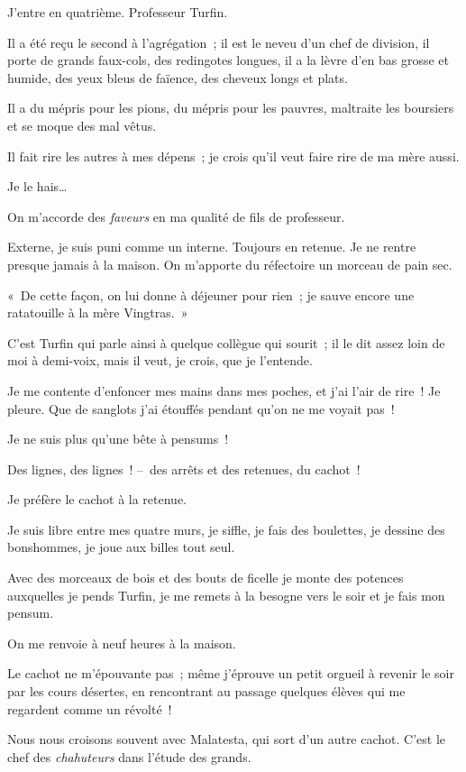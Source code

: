 \documentclass[french,twoside]{book} %
\begin{document}
\noindent J’entre en quatrième. Professeur Turfin.\par
Il a été reçu le second à l’agrégation ; il est le neveu d’un chef de division, il porte de grands faux-cols, des redingotes longues, il a la lèvre d’en bas grosse et humide, des yeux bleus de faïence, des cheveux longs et plats.\par
Il a du mépris pour les pions, du mépris pour les pauvres, maltraite les boursiers et se moque des mal vêtus.\par
Il fait rire les autres à mes dépens ; je crois qu’il veut faire rire de ma mère aussi.\par
Je le hais…\par
\bigbreak
\noindent On m’accorde des \emph{faveurs} en ma qualité de fils de professeur.\par
Externe, je suis puni comme un interne. Toujours en retenue. Je ne rentre presque jamais à la maison. On m’apporte du réfectoire un morceau de pain sec.\par
« De cette façon, on lui donne à déjeuner pour rien ; je sauve encore une ratatouille à la mère Vingtras. »\par
C’est Turfin qui parle ainsi à quelque collègue qui sourit ; il le dit assez loin de moi à demi-voix, mais il veut, je crois, que je l’entende.\par
Je me contente d’enfoncer mes mains dans mes poches, et j’ai l’air de rire ! Je pleure. Que de sanglots j’ai étouffés pendant qu’on ne me voyait pas !\par
\bigbreak
\noindent Je ne suis plus qu’une bête à pensums !\par
Des lignes, des lignes ! – des arrêts et des retenues, du cachot !\par
Je préfère le cachot à la retenue.\par
Je suis libre entre mes quatre murs, je siffle, je fais des boulettes, je dessine des bonshommes, je joue aux billes tout seul.\par
Avec des morceaux de bois et des bouts de ficelle je monte des potences auxquelles je pends Turfin, je me remets à la besogne vers le soir et je fais mon pensum.\par
On me renvoie à neuf heures à la maison.\par
Le cachot ne m’épouvante pas ; même j’éprouve un petit orgueil à revenir le soir par les cours désertes, en rencontrant au passage quelques élèves qui me regardent comme un révolté !\par
Nous nous croisons souvent avec Malatesta, qui sort d’un autre cachot. C’est le chef des \emph{chahuteurs} dans l’étude des grands.\par
\end{document}
